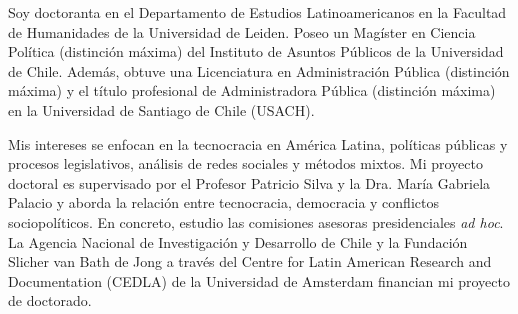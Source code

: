 




\par{Soy doctoranta en el Departamento de Estudios Latinoamericanos en la Facultad de Humanidades de la Universidad de Leiden. Poseo un Magíster en Ciencia Política (distinción máxima) del Instituto de Asuntos Públicos de la Universidad de Chile. Además, obtuve una Licenciatura en Administración Pública (distinción máxima) y el título profesional de Administradora Pública (distinción máxima) en la Universidad de Santiago de Chile (USACH).

Mis intereses se enfocan en la tecnocracia en América Latina, políticas públicas y procesos legislativos, análisis de redes sociales y métodos mixtos. Mi proyecto doctoral es supervisado por el Profesor Patricio Silva y la Dra. María Gabriela Palacio y aborda la relación entre tecnocracia, democracia y conflictos sociopolíticos. En concreto, estudio las comisiones asesoras presidenciales {\itshape ad hoc}. La Agencia Nacional de Investigación y Desarrollo de Chile y la Fundación Slicher van Bath de Jong a través del Centre for Latin American Research and Documentation (CEDLA) de la Universidad de Amsterdam financian mi proyecto de doctorado.}\\